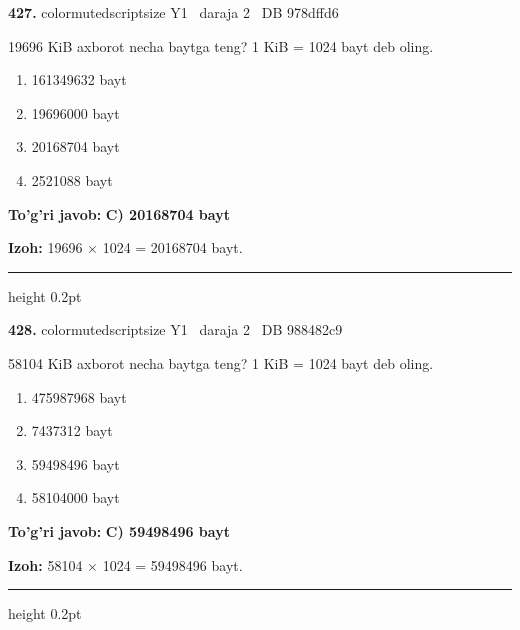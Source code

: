 \documentclass[10pt,a4paper,oneside]{article}
\begin{document}
\noindent\textbf{\color{ink}427.}  {color{muted}scriptsize Y1 \textbullet\ daraja 2 \textbullet\ DB 978dffd6}
\par
19696 KiB axborot necha baytga teng? 1 KiB = 1024 bayt deb oling.
\begin{enumerate}[label=\Alph*),leftmargin=9mm]
\item 161349632 bayt
\item 19696000 bayt
\item 20168704 bayt
\item 2521088 bayt
\end{enumerate}
\begin{tcolorbox}[enhanced,breakable,colback=teal!4,colframe=teal!50!black,boxrule=0.5pt,arc=1.1mm,left=3mm,right=3mm,top=1.7mm,bottom=1.7mm,before skip=2mm,after skip=2mm]
\textbf{\color{teal}To'g'ri javob:} \textbf{C) 20168704 bayt}
\par\smallskip
\textbf{Izoh:} 19696 \ensuremath{\times} 1024 = 20168704 bayt.
\end{tcolorbox}
\vspace{2mm}\hrule height 0.2pt \vspace{3mm}

\noindent\textbf{\color{ink}428.}  {color{muted}scriptsize Y1 \textbullet\ daraja 2 \textbullet\ DB 988482c9}
\par
58104 KiB axborot necha baytga teng? 1 KiB = 1024 bayt deb oling.
\begin{enumerate}[label=\Alph*),leftmargin=9mm]
\item 475987968 bayt
\item 7437312 bayt
\item 59498496 bayt
\item 58104000 bayt
\end{enumerate}
\begin{tcolorbox}[enhanced,breakable,colback=teal!4,colframe=teal!50!black,boxrule=0.5pt,arc=1.1mm,left=3mm,right=3mm,top=1.7mm,bottom=1.7mm,before skip=2mm,after skip=2mm]
\textbf{\color{teal}To'g'ri javob:} \textbf{C) 59498496 bayt}
\par\smallskip
\textbf{Izoh:} 58104 \ensuremath{\times} 1024 = 59498496 bayt.
\end{tcolorbox}
\vspace{2mm}\hrule height 0.2pt \vspace{3mm}
\end{document}
